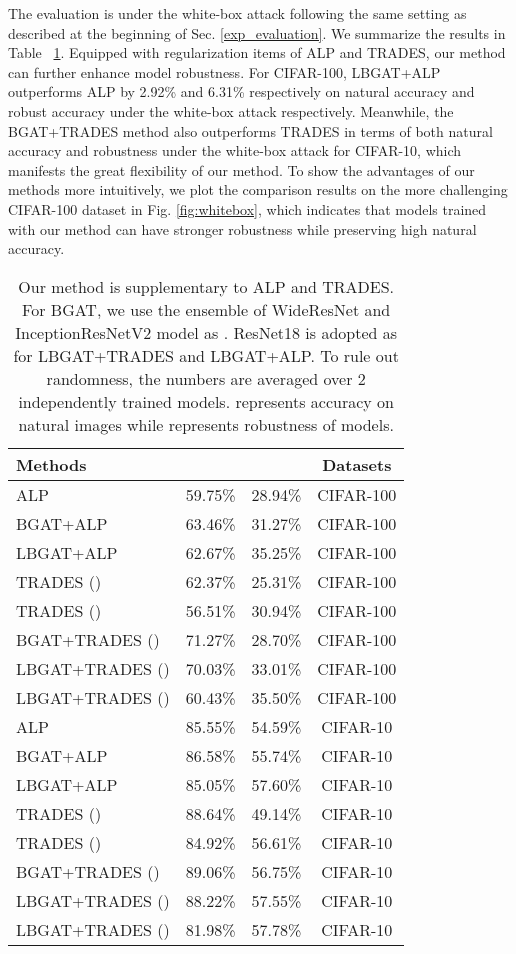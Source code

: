 \documentclass[final]{cvpr}
\begin{document}
The evaluation is under the white-box attack following the same setting as described at the beginning of Sec. \ref{exp_evaluation}.
We summarize the results in Table ~\ref{tab:flexibility}. Equipped with regularization items of ALP and TRADES, our method can further enhance model robustness. For CIFAR-100, LBGAT+ALP outperforms ALP by 2.92\% and 6.31\% respectively on natural accuracy and robust accuracy under the white-box attack respectively. Meanwhile, the BGAT+TRADES method also outperforms TRADES in terms of both natural accuracy and robustness under the white-box attack for CIFAR-10, which manifests the great flexibility of our method. To show the advantages of our methods more intuitively, we plot the comparison results on the more challenging CIFAR-100 dataset in Fig. \ref{fig:whitebox}, which indicates that models trained with our method can have stronger robustness while preserving high natural accuracy.

\begin{table}[h]
	\footnotesize
	\centering
	\caption{Our method is supplementary to ALP and TRADES. For BGAT, we use the ensemble of WideResNet and InceptionResNetV2 model as . ResNet18 is adopted as  for LBGAT+TRADES and LBGAT+ALP. To rule out randomness, the numbers are averaged over 2 independently trained models.  represents accuracy on natural images while  represents robustness of models.} 
	\begin{tabular}{l|c|c|c}
		\textbf{Methods} & & &\textbf{Datasets} \\
		\hline
		\hline
		ALP      & 59.75\% & 28.94\% &CIFAR-100\\
		BGAT+ALP  & 63.46\% & 31.27\% &CIFAR-100\\
		LBGAT+ALP & 62.67\% & 35.25\% &CIFAR-100\\
		TRADES ()      &62.37\% &25.31\% &CIFAR-100 \\
		TRADES ()      &56.51\% &30.94\% &CIFAR-100 \\
		BGAT+TRADES ()  &71.27\% &28.70\% &CIFAR-100 \\
		LBGAT+TRADES () &70.03\% &33.01\% &CIFAR-100 \\
		LBGAT+TRADES () &60.43\% &35.50\% &CIFAR-100 \\
		\hline
		ALP       &85.55\% &54.59\% &CIFAR-10\\
		BGAT+ALP  &86.58\% &55.74\% &CIFAR-10\\
		LBGAT+ALP &85.05\% &57.60\% &CIFAR-10\\
		TRADES () &88.64\% &49.14\% &CIFAR-10 \\
		TRADES ()       &84.92\% &56.61\% &CIFAR-10 \\
		BGAT+TRADES ()  &89.06\% &56.75\% &CIFAR-10 \\
		LBGAT+TRADES () &88.22\% &57.55\% &CIFAR-10 \\
		LBGAT+TRADES () &81.98\% &57.78\% &CIFAR-10 \\
		\hline
	\end{tabular}
	\label{tab:flexibility}
\end{table}
\end{document}
